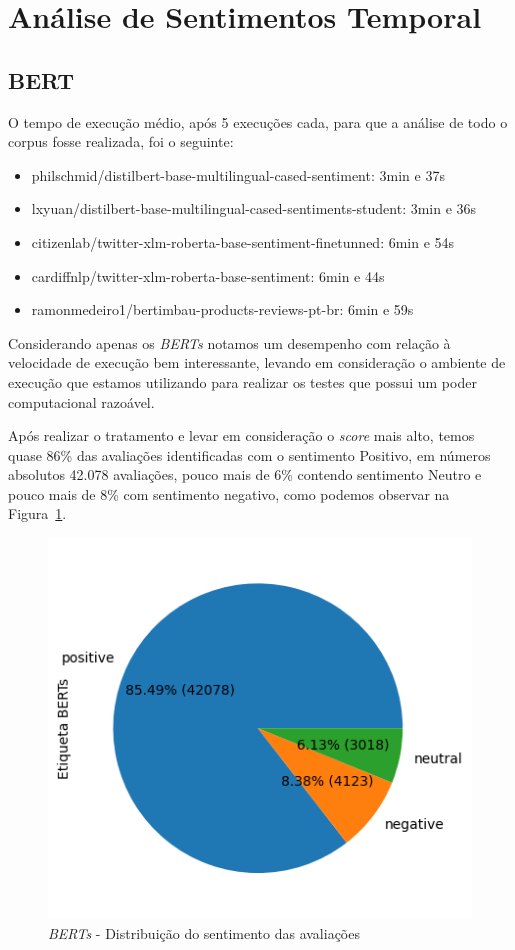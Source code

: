 \section{Análise de Sentimentos Temporal}
\label{cap:resultados:sec:analise_sentimento}

\subsection[BERT]{BERT}
\label{sec:resultados:subsec:bert}

O tempo de execução médio, após 5 execuções cada, para que a análise de todo o corpus fosse realizada, foi o seguinte:

\begin{itemize}
	\item philschmid/distilbert-base-multilingual-cased-sentiment: 3min e 37s
	\item lxyuan/distilbert-base-multilingual-cased-sentiments-student: 3min e 36s
	\item citizenlab/twitter-xlm-roberta-base-sentiment-finetunned: 6min e 54s
	\item cardiffnlp/twitter-xlm-roberta-base-sentiment: 6min e 44s
	\item ramonmedeiro1/bertimbau-products-reviews-pt-br: 6min e 59s
\end{itemize}

Considerando apenas os \textit{BERTs} notamos um desempenho com relação à velocidade de execução bem interessante, levando em consideração o ambiente de execução que estamos utilizando para realizar os testes que possui um poder computacional razoável.

Após realizar o tratamento e levar em consideração o \textit{score} mais alto, temos quase 86\% das avaliações identificadas com o sentimento Positivo, em números absolutos 42.078 avaliações, pouco mais de 6\% contendo sentimento Neutro e pouco mais de 8\% com sentimento negativo, como podemos observar na Figura~\ref{img:sentimento_bert}.

\begin{figure}
	\centering
	\includegraphics{figs/bert/distribuicao_pizza.png}
	\caption{\textit{BERTs} - Distribuição do sentimento das avaliações}
	\label{img:sentimento_bert}
\end{figure}

